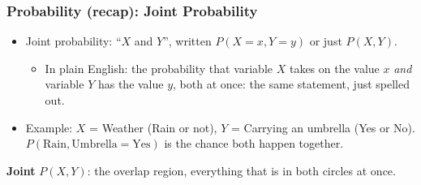 \begin{frame}[fragile]\frametitle{Probability (recap): Joint Probability}
\begin{itemize}
\item Joint probability: ``$X$ and $Y$'', written $P(X=x, Y=y)$ or just $P(X,Y)$.
  \begin{itemize}
  \item In plain English: the probability that variable $X$ takes on the value $x$ \emph{and} variable $Y$ has the value $y$, both at once: the same statement, just spelled out.
  \end{itemize}
\item Example: $X$ = Weather (Rain or not), $Y$ = Carrying an umbrella (Yes or No). $P(\text{Rain}, \text{Umbrella}{=}\text{Yes})$ is the chance both happen together.
\end{itemize}
\begin{center}

{\small \textbf{Joint} $P(X,Y)$: the overlap region, everything that is in both circles at once.}
\end{center}
\end{frame}

